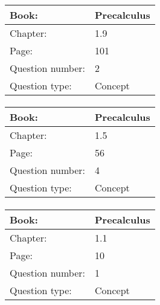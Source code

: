 \documentclass{article}
\begin{document}
            \paragraph{}
            \begin{tabularx}{1\textwidth}{
                    p{}
                    p{}
                }
                \toprule
                Book: & Precalculus
                \\
                \midrule
                Chapter: & 1.9
                \\
                \midrule
                Page: & 101
                \\
                \midrule
                Question number: & 2
                \\
                \midrule
                Question type: & Concept
                \\
                \bottomrule
            \end{tabularx}
            
            \paragraph{}
            \begin{tabularx}{1\textwidth}{
                    p{}
                    p{}
                }
                \toprule
                Book: & Precalculus
                \\
                \midrule
                Chapter: & 1.5
                \\
                \midrule
                Page: & 56
                \\
                \midrule
                Question number: & 4
                \\
                \midrule
                Question type: & Concept
                \\
                \bottomrule
            \end{tabularx}
            
            \paragraph{}
            \begin{tabularx}{1\textwidth}{
                    p{}
                    p{}
                }
                \toprule
                Book: & Precalculus
                \\
                \midrule
                Chapter: & 1.1
                \\
                \midrule
                Page: & 10
                \\
                \midrule
                Question number: & 1
                \\
                \midrule
                Question type: & Concept
                \\
                \bottomrule
            \end{tabularx}
            
\end{document}
